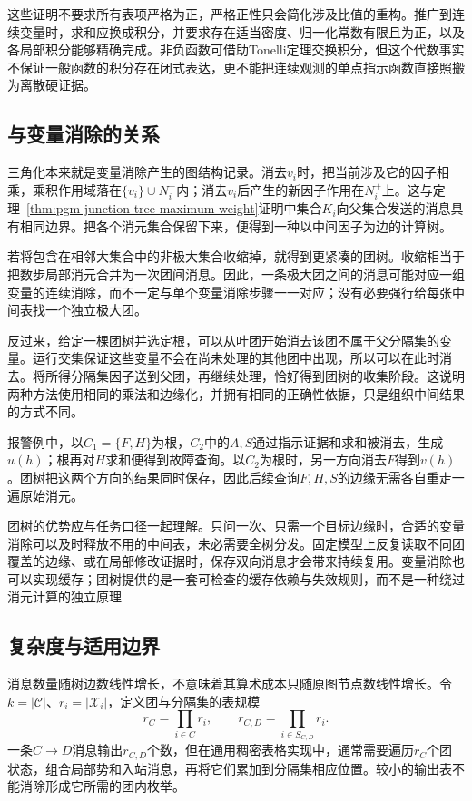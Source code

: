 这些证明不要求所有表项严格为正，严格正性只会简化涉及比值的重构。推广到连续变量时，求和应换成积分，并要求存在适当密度、归一化常数有限且为正，以及各局部积分能够精确完成。非负函数可借助Tonelli定理交换积分，但这个代数事实不保证一般函数的积分存在闭式表达，更不能把连续观测的单点指示函数直接照搬为离散硬证据。

\subsection{与变量消除的关系}
\label{sec:pgm-junction-tree-ve-relation}

三角化本来就是变量消除产生的图结构记录。消去$v_i$时，把当前涉及它的因子相乘，乘积作用域落在$\{v_i\}\cup N_i^+$内；消去$v_i$后产生的新因子作用在$N_i^+$上。这与定理~\ref{thm:pgm-junction-tree-maximum-weight}证明中集合$K_i$向父集合发送的消息具有相同边界。把各个消元集合保留下来，便得到一种以中间因子为边的计算树。

若将包含在相邻大集合中的非极大集合收缩掉，就得到更紧凑的团树。收缩相当于把数步局部消元合并为一次团间消息。因此，一条极大团之间的消息可能对应一组变量的连续消除，而不一定与单个变量消除步骤一一对应；没有必要强行给每张中间表找一个独立极大团。

反过来，给定一棵团树并选定根，可以从叶团开始消去该团不属于父分隔集的变量。运行交集保证这些变量不会在尚未处理的其他团中出现，所以可以在此时消去。将所得分隔集因子送到父团，再继续处理，恰好得到团树的收集阶段。这说明两种方法使用相同的乘法和边缘化，并拥有相同的正确性依据，只是组织中间结果的方式不同。

报警例中，以$C_1=\{F,H\}$为根，$C_2$中的$A,S$通过指示证据和求和被消去，生成$u(h)$；根再对$H$求和便得到故障查询。以$C_2$为根时，另一方向消去$F$得到$v(h)$。团树把这两个方向的结果同时保存，因此后续查询$F,H,S$的边缘无需各自重走一遍原始消元。

团树的优势应与任务口径一起理解。只问一次、只需一个目标边缘时，合适的变量消除可以及时释放不用的中间表，未必需要全树分发。固定模型上反复读取不同团覆盖的边缘、或在局部修改证据时，保存双向消息才会带来持续复用。变量消除也可以实现缓存；团树提供的是一套可检查的缓存依赖与失效规则，而不是一种绕过消元计算的独立原理

\subsection{复杂度与适用边界}
\label{sec:pgm-junction-tree-complexity}

消息数量随树边数线性增长，不意味着其算术成本只随原图节点数线性增长。令$k=|\mathcal{C}|$、$r_i=|\mathcal{X}_i|$，定义团与分隔集的表规模
\begin{equation}
  r_C=\prod_{i\in C}r_i,\qquad
  r_{C,D}=\prod_{i\in S_{C,D}}r_i.
  \label{eq:pgm-junction-tree-table-sizes}
\end{equation}
一条$C\to D$消息输出$r_{C,D}$个数，但在通用稠密表格实现中，通常需要遍历$r_C$个团状态，组合局部势和入站消息，再将它们累加到分隔集相应位置。较小的输出表不能消除形成它所需的团内枚举。

